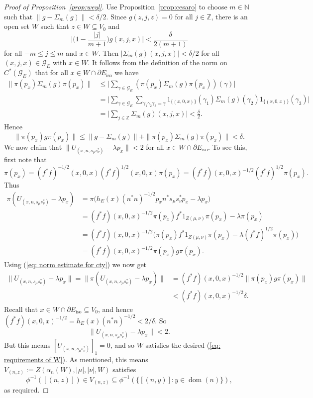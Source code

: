 \documentclass[12pt, a4paper]{amsart}
\numberwithin{equation}{section}
\theoremstyle{definition}
\theoremstyle{remark}
\begin{document}
\begin{proof}[Proof of Proposition~\ref{prop:weyl}]
Use Proposition~\ref{prop:cesaro} to choose $m\in{\mathbb{N}}$ such that 
$\|g-\Sigma_m(g)\|<\delta/2$. Since $g(z,j,z)=0$ for all $j\in{\mathbb{Z}}$, there is an 
open set $W$ such that $z\in W\subseteq V_0$ and 
\begin{equation}\label{eq: g funct identity}
\Big|\Big(1-\frac{|j|}{m+1}\Big)g(x,j,x)\Big|<\frac{\delta}{2(m+1)}
\end{equation}
for all $-m\le j\le m$ and $x\in W$. Then $|\Sigma_m(g)(x,j,x)|<\delta/2$ for 
all $(x,j,x)\in{\mathcal{G}}_E$ with $x\in W$. It follows from the definition of the 
norm on $C^*({\mathcal{G}}_E)$ that for all $x\in W\cap\partial E_{{\operatorname{iso}}}$ we have
\begin{align*}
\|\pi(p_x)\Sigma_m(g)\pi(p_x)\| &\le \Big|\sum_{\gamma\in{\mathcal{G}}_E}(\pi(p_x)
\Sigma_m(g)\pi(p_x))(\gamma)\Big|\\
&= \Big|\sum_{\gamma\in{\mathcal{G}}_E}\sum_{\gamma_1\gamma_2\gamma_3=\gamma}
1_{\{(x,0,x)\}}(\gamma_1)\Sigma_m(g)(\gamma_2)1_{\{(x,0,x)\}}(\gamma_3)\Big|\\
&=\Big|\sum_{j\in{\mathbb{Z}}}\Sigma_m(g)(x,j,x)\Big| <\frac{\delta}{2}.
\end{align*}
Hence
\begin{equation}\label{eq: norm estimate for cty}
\|\pi(p_x)g\pi(p_x)\|\le\|g-\Sigma_m(g)\|+\|\pi(p_x)\Sigma_m(g)\pi(p_x)\|<\delta.
\end{equation}
We now claim that $\|U_{(x,n,s_\mu s_\nu^*)}-\lambda p_x\|<2$ for all $x\in 
W\cap\partial E_{{\operatorname{iso}}}$. To see this, first note that 
\[
\pi(p_x)=(f^*f)^{-1/2}(x,0,x) (f^*f)^{1/2}(x,0,x) \pi(p_x)=(f^*f)(x,0,x)^{-1/2}(f^*f)^{1/2} 
\pi(p_x).
\]
Thus
\begin{align*}
\pi(U_{(x,n,s_\mu s_\nu^*)}-\lambda p_x) &= 
\pi\big(h_E(x)(n^*n)^{-1/2}p_xn^*s_\mu s_\nu^* p_x-\lambda p_x\big)\\
&= (f^*f)(x,0,x)^{-1/2}\pi(p_x)f^*1_{Z(\mu,\nu)}\pi(p_x)-\lambda\pi(p_x)\\
&= 
(f^*f)(x,0,x)^{-1/2}\big(\pi(p_x)f^*1_{Z(\mu,\nu)}\pi(p_x)-\lambda(f^*f)^{1/2} 
\pi(p_x)\big)\\
&=(f^*f)(x,0,x)^{-1/2}\pi(p_x)g\pi(p_x).
\end{align*}
Using (\ref{eq: norm estimate for cty}) we now get
\begin{align*}
\|U_{(x,n,s_\mu s_\nu^*)}-\lambda p_x\|=\|\pi(U_{(x,n,s_\mu s_\nu^*)}-\lambda 
p_x)\|&=(f^*f)(x,0,x)^{-1/2}\|\pi(p_x)g\pi(p_x)\|\\
&<(f^*f)(x,0,x)^{-1/2}\delta.
\end{align*}
Recall that $x\in W\cap \partial E_{{\operatorname{iso}}}\subseteq V_0$, and hence 
$(f^*f)(x,0,x)^{-1/2}=h_E(x)(n^*n)^{-1/2}<2/\delta$. So 
\[
\|U_{(x,n,s_\mu s_\nu^*)}-\lambda p_x\|<2.
\]
But this means $[U_{(x,n,s_\mu s_\nu^*)}]_1=0$, and so $W$ satisfies the 
desired (\ref{eq: requirements of W}). As mentioned, this means 
$V_{(n,z)}:=Z(\alpha_n(W),|\mu|,|\nu|,W)$ 
satisfies 
\[
\phi^{-1}([(n,z)])\in V_{(n,z)}\subseteq \phi^{-1}(\{[(n,y)]:y\in 
{{\operatorname{dom}}}(n)\}),
\]
as required. 
\end{proof}
\end{document}
